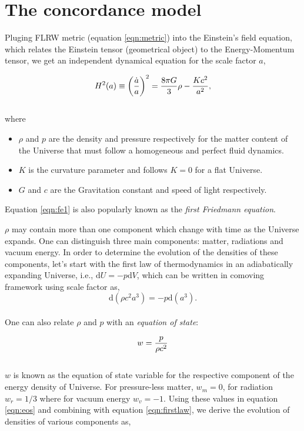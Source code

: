 \section{The concordance model}


Pluging FLRW metric (equation \ref{eqn:metric}) into the Einstein's field equation, 
which relates the Einstein tensor (geometrical object) to the Energy-Momentum tensor, 
we get an independent dynamical equation
for the scale factor $a$,

\begin{equation}
\centering
H^2(a) \equiv \left( \dfrac{\dot{a}}{a} \right)^2 = 
			\dfrac{8 \pi G}{3} \rho - \dfrac{Kc^2}{a^2},
\label{eqn:fe1}
\end{equation}
\\
where
\begin{itemize}
\item$\rho$ and $p$ are the density and pressure respectively for the matter content
of the Universe that must follow a homogeneous and perfect fluid dynamics. 
\item $K$ is the curvature parameter and follows $K=0$ for a flat Universe. 
\item $G$ and $c$ are
the Gravitation constant and speed of light respectively. 
\end{itemize}
Equation \ref{eqn:fe1} is 
also popularly known as the {\it first Friedmann equation}.

$\rho$ may contain more than one component which change with time as the Universe 
expands. One can distinguish three main components: matter, radiations and vacuum 
energy. In order to determine the evolution of the densities of these components,
let's start with the first law of thermodynamics in an adiabatically expanding Universe,
i.e., $\mathrm{d}U = -p\mathrm{d}V$, which can be written in comoving framework
using scale factor as,
\begin{equation}
	\mathrm{d}(\rho c^2 a^3) = -p \mathrm{d} (a^3).
	\label{eqn:firstlaw}
\end{equation}
\\
One can also relate $\rho$ and $p$ with an {\it equation of state}:

\begin{equation}
\centering
w = \dfrac{p}{\rho c^2}
\label{eqn:eos}
\end{equation}
\\
$w$ is known as the equation of state variable for the respective component
of the energy density of Universe. For pressure-less matter, $w_m=0$,
for radiation $w_r=1/3$ where for vacuum energy $w_v=-1$. Using these values 
in equation \ref{eqn:eos} and combining with equation \ref{eqn:firstlaw}, we 
derive the evolution of densities of various components as,


